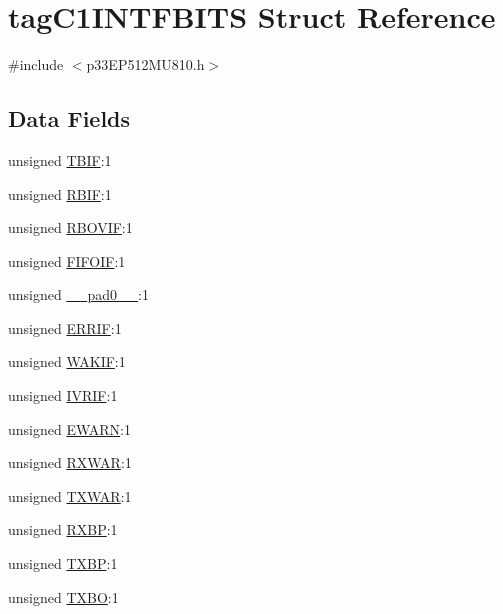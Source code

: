 \hypertarget{structtag_c1_i_n_t_f_b_i_t_s}{}\section{tag\+C1\+I\+N\+T\+F\+B\+I\+TS Struct Reference}
\label{structtag_c1_i_n_t_f_b_i_t_s}


{\ttfamily \#include $<$p33\+E\+P512\+M\+U810.\+h$>$}

\subsection*{Data Fields}
\begin{DoxyCompactItemize}
\item 
unsigned \hyperlink{structtag_c1_i_n_t_f_b_i_t_s_af48a2e866e1aeeb62bb2962746d7ce7f}{T\+B\+IF}\+:1
\item 
unsigned \hyperlink{structtag_c1_i_n_t_f_b_i_t_s_ad8f6df4237b4615b8389534a9bd451da}{R\+B\+IF}\+:1
\item 
unsigned \hyperlink{structtag_c1_i_n_t_f_b_i_t_s_a60e9b9f5e30376a0795eefa09cc0eb14}{R\+B\+O\+V\+IF}\+:1
\item 
unsigned \hyperlink{structtag_c1_i_n_t_f_b_i_t_s_a9c3e21be2d8d9122ed6f61d5c675385a}{F\+I\+F\+O\+IF}\+:1
\item 
unsigned \hyperlink{structtag_c1_i_n_t_f_b_i_t_s_adf71f3d8410c1f1dbbc96680a92c49af}{\+\_\+\+\_\+pad0\+\_\+\+\_\+}\+:1
\item 
unsigned \hyperlink{structtag_c1_i_n_t_f_b_i_t_s_a62aac73179ca441b764a9e62698a5a28}{E\+R\+R\+IF}\+:1
\item 
unsigned \hyperlink{structtag_c1_i_n_t_f_b_i_t_s_aede7ce476b475e1cd66dffa184f2daa1}{W\+A\+K\+IF}\+:1
\item 
unsigned \hyperlink{structtag_c1_i_n_t_f_b_i_t_s_a5a63b230ca0f7c3efb1fadd88115ed5c}{I\+V\+R\+IF}\+:1
\item 
unsigned \hyperlink{structtag_c1_i_n_t_f_b_i_t_s_ab3ab490c08fd5a31b6369336577ae209}{E\+W\+A\+RN}\+:1
\item 
unsigned \hyperlink{structtag_c1_i_n_t_f_b_i_t_s_addd555f3cd835526434df03b9ea5c71e}{R\+X\+W\+AR}\+:1
\item 
unsigned \hyperlink{structtag_c1_i_n_t_f_b_i_t_s_ac9817dd2af797e3801322ff283de379e}{T\+X\+W\+AR}\+:1
\item 
unsigned \hyperlink{structtag_c1_i_n_t_f_b_i_t_s_a953d8f21b3b98f0779f1bf72e0d47c62}{R\+X\+BP}\+:1
\item 
unsigned \hyperlink{structtag_c1_i_n_t_f_b_i_t_s_a5786f0e7a7a316717ee7fc4b36a91284}{T\+X\+BP}\+:1
\item 
unsigned \hyperlink{structtag_c1_i_n_t_f_b_i_t_s_a2f832810cd057ffa5ffcde300d853a1b}{T\+X\+BO}\+:1
\end{DoxyCompactItemize}



